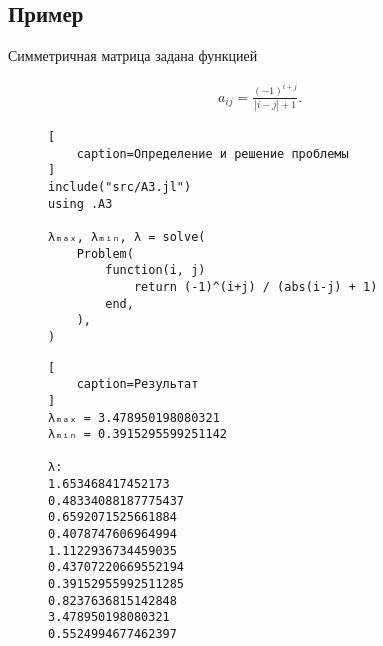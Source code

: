 \subsection{Пример}

Симметричная матрица задана функцией

\hs
\begin{gather}
    a_{ij} = \frac{(-1)^{i + j}}{\left| i - j \right| + 1}.
\end{gather}

\begin{figure}[H]
\begin{lstlisting}[
    caption=Определение и решение проблемы
]
include("src/A3.jl")
using .A3

λₘₐₓ, λₘᵢₙ, λ = solve(
    Problem(
        function(i, j)
            return (-1)^(i+j) / (abs(i-j) + 1)
        end,
    ),
)
\end{lstlisting}
\end{figure}

\begin{figure}[H]
\begin{lstlisting}[
    caption=Результат
]
λₘₐₓ = 3.478950198080321
λₘᵢₙ = 0.3915295599251142

λ:
1.653468417452173
0.48334088187775437
0.6592071525661884
0.4078747606964994
1.1122936734459035
0.43707220669552194
0.39152955992511285
0.8237636815142848
3.478950198080321
0.5524994677462397
\end{lstlisting}
\end{figure}


